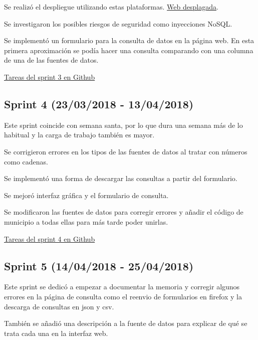 Se realizó el despliegue utilizando estas plataformas. \href{http://tfg-datos-publicos.nanoapp.io/}{Web desplagada}.

Se investigaron los posibles riesgos de seguridad como inyecciones NoSQL.

Se implementó un formulario para la consulta de datos en la página web. En esta primera aproximación se podía hacer una consulta comparando con una columna de una de las fuentes de datos.


\href{https://github.com/IvanArjona/TFG-Datos-publicos/milestone/4?closed=1}{Tareas del sprint 3 en Github}

\subsection{Sprint 4 (23/03/2018 - 13/04/2018)}

Este sprint coincide con semana santa, por lo que dura una semana más de lo habitual y la carga de trabajo también es mayor.

Se corrigieron errores en los tipos de las fuentes de datos al tratar con números como cadenas. 

Se implementó una forma de descargar las consultas a partir del formulario. 

Se mejoró interfaz gráfica y el formulario de consulta.

Se modificaron las fuentes de datos para corregir errores y añadir el código de municipio a todas ellas para más tarde poder unirlas.


\href{https://github.com/IvanArjona/TFG-Datos-publicos/milestone/5?closed=1}{Tareas del sprint 4 en Github}

\subsection{Sprint 5 (14/04/2018 - 25/04/2018)}

Este sprint se dedicó a empezar a documentar la memoria y corregir algunos errores en la página de consulta como el reenvio de formularios en firefox y la descarga de consultas en json y csv.

También se añadió una descripción a la fuente de datos para explicar de qué se trata cada una en la interfaz web.


